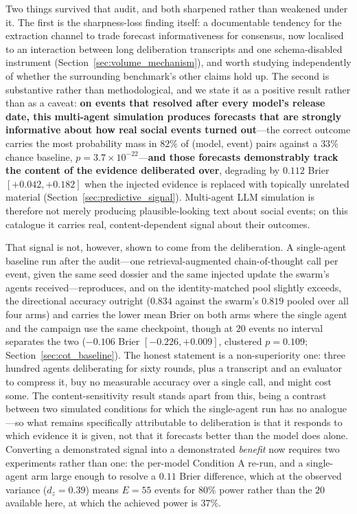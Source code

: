\documentclass[11pt,journal,onecolumn]{IEEEtran}
\begin{document}
Two things survived that audit, and both sharpened rather than weakened under it. The first is the sharpness-loss finding itself: a documentable tendency for the extraction channel to trade forecast informativeness for consensus, now localised to an interaction between long deliberation transcripts and one schema-disabled instrument (Section~\ref{sec:volume_mechanism}), and worth studying independently of whether the surrounding benchmark's other claims hold up. The second is substantive rather than methodological, and we state it as a positive result rather than as a caveat: \textbf{on events that resolved after every model's release date, this multi-agent simulation produces forecasts that are strongly informative about how real social events turned out}---the correct outcome carries the most probability mass in $82\%$ of (model, event) pairs against a $33\%$ chance baseline, $p = 3.7\times10^{-22}$---\textbf{and those forecasts demonstrably track the content of the evidence deliberated over}, degrading by $0.112$ Brier $[+0.042, +0.182]$ when the injected evidence is replaced with topically unrelated material (Section~\ref{sec:predictive_signal}). Multi-agent LLM simulation is therefore not merely producing plausible-looking text about social events; on this catalogue it carries real, content-dependent signal about their outcomes.

That signal is not, however, shown to come from the deliberation. A single-agent baseline run after the audit---one retrieval-augmented chain-of-thought call per event, given the same seed dossier and the same injected update the swarm's agents received---reproduces, and on the identity-matched pool slightly exceeds, the directional accuracy outright ($0.834$ against the swarm's $0.819$ pooled over all four arms) and carries the lower mean Brier on both arms where the single agent and the campaign use the same checkpoint, though at $20$ events no interval separates the two ($-0.106$ Brier $[-0.226, +0.009]$, clustered $p = 0.109$; Section~\ref{sec:cot_baseline}). The honest statement is a non-superiority one: three hundred agents deliberating for sixty rounds, plus a transcript and an evaluator to compress it, buy no measurable accuracy over a single call, and might cost some. The content-sensitivity result stands apart from this, being a contrast between two simulated conditions for which the single-agent run has no analogue---so what remains specifically attributable to deliberation is that it responds to which evidence it is given, not that it forecasts better than the model does alone. Converting a demonstrated signal into a demonstrated \emph{benefit} now requires two experiments rather than one: the per-model Condition A re-run, and a single-agent arm large enough to resolve a $0.11$ Brier difference, which at the observed variance ($d_z = 0.39$) means $E = 55$ events for $80\%$ power rather than the $20$ available here, at which the achieved power is $37\%$.
\end{document}
